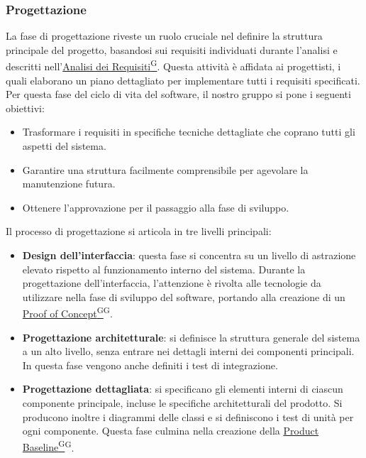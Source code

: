 \subsubsection{Progettazione}
La fase di progettazione riveste un ruolo cruciale nel definire la struttura principale del progetto, 
basandosi sui requisiti individuati durante l'analisi e descritti 
nell’\href{https://code7crusaders.github.io/docs/RTB/documentazione_interna/glossario.html#analisi-dei-requisiti}{Analisi dei Requisiti\textsuperscript{G}}. 
Questa attività è affidata ai progettisti, i quali elaborano un piano dettagliato per implementare tutti i requisiti specificati.  
Per questa fase del ciclo di vita del software, il nostro gruppo si pone i seguenti obiettivi:
\begin{itemize}
    \item Trasformare i requisiti in specifiche tecniche dettagliate che coprano tutti gli aspetti del sistema.
    \item Garantire una struttura facilmente comprensibile per agevolare la manutenzione futura.
    \item Ottenere l’approvazione per il passaggio alla fase di sviluppo.
\end{itemize}
Il processo di progettazione si articola in tre livelli principali:
\begin{itemize}
    \item \textbf{Design dell’interfaccia}: questa fase si concentra su un livello di astrazione elevato rispetto al 
    funzionamento interno del sistema. Durante la progettazione dell’interfaccia, l’attenzione è rivolta alle 
    tecnologie da utilizzare nella fase di sviluppo del software, portando alla creazione di 
    un \href{https://code7crusaders.github.io/docs/RTB/documentazione_interna/glossario.html#poc-proof-of-concept}{Proof of Concept\textsuperscript{G}}\textsuperscript{G}.
    \item \textbf{Progettazione architetturale}: si definisce la struttura generale del sistema a un alto livello, senza 
    entrare nei dettagli interni dei componenti principali. In questa fase vengono anche definiti i test di integrazione.
    \item \textbf{Progettazione dettagliata}: si specificano gli elementi interni di ciascun componente principale, 
    incluse le specifiche architetturali del prodotto. Si producono inoltre i diagrammi delle classi e si definiscono 
    i test di unità per ogni componente. Questa fase culmina nella creazione 
    della \href{https://code7crusaders.github.io/docs/RTB/documentazione_interna/glossario.html#pb-product-baseline}{Product Baseline\textsuperscript{G}}\textsuperscript{G}.
\end{itemize}


